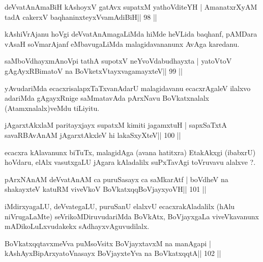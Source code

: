 
\begin{shl}
deVvatAnAmaBiH kAshoyxV gatAvx supatxM yathoVditeYH |
AmanatxrXyAM tadA cakerxV baqhaninxteyxVvamAdiBiH\hfill || 98 ||
\end{shl}

\begin{artha}
kAshiVrAjanu hoVgi deVvatAnAmagaLiMda hiMde heVLida baqhanf,  pAMDara\-	vAsaH soVmarAjanf eMbavugaLiMda malagidavananunx AvAga karedanu.
\end{artha}

\begin{shl}
saMboVdhayxmAnoV\s pi tathA supotxV neYvoVdabudhayxta |
yatoV\s toV gAgAyxRBimatoV na BoVketxVtayxvagamayxteV\hfill || 99 ||
\end{shl}

\begin{artha}
yAvudariMda ecacxrisalapxTaTxvanAdarU malagidavanu ecacxrAgaleV ilalxvo adariMda gAgayxRnige saMmatavAda pArxNavu BoVkatxnalalx (Atamxnalalx)veMdu tiLiyitu.
\end{artha} 


\begin{shl}
jAgarxtAkxlaM paritayxjayx supatxM kimiti jagamxtuH |
sapxSaTxtA savaRBAvAnAM jAgarxtAkxleV hi lakaSxyXteV\hfill || 100 ||
\end{shl}

\begin{artha}
ecacxra kAlavanunx biTuTx, malagidAga (avana hatitxra) EtakAkxgi (ibabxrU) hoVdaru, elAlx vasutxgaLU jAgara kAladalilx suPxTavAgi toVruvavu  alalxve ?.
\end{artha}


\begin{shl}
pArxNAnAM deVvatAnAM ca puruSasayx ca saMkarAtf |
boVdheV na shakayxteV katuRM viveVkoV BoVkatxqqBoVjayxyoVH\hfill || 101 ||
\end{shl}

\begin{artha}
iMdirxyagaLU, deVvategaLU, puruSanU elalxvU ecacxrakAladalilx (hAlu niVru\-gaLaMte) seVrikoMDiruvudariMda BoVkAtx, BoVjayxgaLa viveVkavanunx mADi\-koLuLxvudakekx sAdhayxvAguvudilalx.
\end{artha} 

\begin{shl}
BoVkatxqqtavxmeVva puMsoV\s sitx BoVjayxtavxM na manAgapi |
kAshAyxBipArxyatoV\s nasayx BoVjayxteYva na BoVkatxqqtA\hfill || 102 ||
\end{shl}


